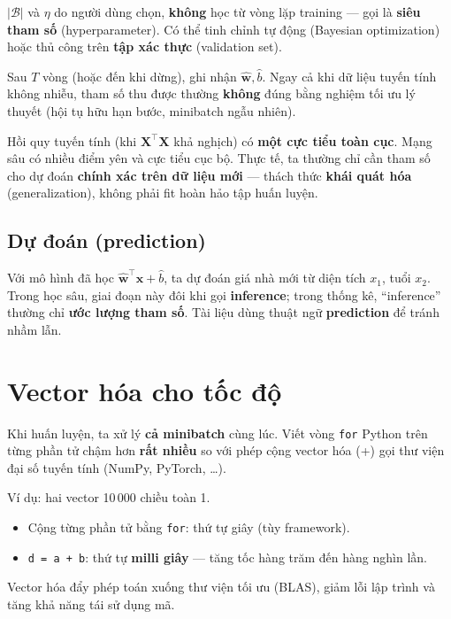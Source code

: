 \documentclass[12pt,a4paper]{article}
\begin{document}
\begin{dinhnghia}[title={Hyperparameter}]
$|\mathcal{B}|$ và $\eta$ do người dùng chọn, \textbf{không} học từ vòng lặp training --- gọi là \textbf{siêu tham số} (hyperparameter). Có thể tinh chỉnh tự động (Bayesian optimization) hoặc thủ công trên \textbf{tập xác thực} (validation set).

Sau $T$ vòng (hoặc đến khi dừng), ghi nhận $\hat{\mathbf{w}}, \hat{b}$. Ngay cả khi dữ liệu tuyến tính không nhiễu, tham số thu được thường \textbf{không} đúng bằng nghiệm tối ưu lý thuyết (hội tụ hữu hạn bước, minibatch ngẫu nhiên).
\end{dinhnghia}

\begin{ynghia}[title={Tối thiểu toàn cục và khái quát hóa}]
Hồi quy tuyến tính (khi $\mathbf{X}^\top\mathbf{X}$ khả nghịch) có \textbf{một cực tiểu toàn cục}. Mạng sâu có nhiều điểm yên và cực tiểu cục bộ. Thực tế, ta thường chỉ cần tham số cho dự đoán \textbf{chính xác trên dữ liệu mới} --- thách thức \textbf{khái quát hóa} (generalization), không phải fit hoàn hảo tập huấn luyện.
\end{ynghia}

\subsection{Dự đoán (prediction)}

Với mô hình đã học $\hat{\mathbf{w}}^\top \mathbf{x} + \hat{b}$, ta dự đoán giá nhà mới từ diện tích $x_1$, tuổi $x_2$. Trong học sâu, giai đoạn này đôi khi gọi \textbf{inference}; trong thống kê, ``inference'' thường chỉ \textbf{ước lượng tham số}. Tài liệu dùng thuật ngữ \textbf{prediction} để tránh nhầm lẫn.

\newpage

\section{Vector hóa cho tốc độ}

\begin{dongco}[title={Tại sao vector hóa?}]
Khi huấn luyện, ta xử lý \textbf{cả minibatch} cùng lúc. Viết vòng \texttt{for} Python trên từng phần tử chậm hơn \textbf{rất nhiều} so với phép cộng vector hóa (+) gọi thư viện đại số tuyến tính (NumPy, PyTorch, \ldots).

Ví dụ: hai vector 10\,000 chiều toàn 1.
\begin{itemize}
  \item Cộng từng phần tử bằng \texttt{for}: thứ tự giây (tùy framework).
  \item \texttt{d = a + b}: thứ tự \textbf{milli giây} --- tăng tốc hàng trăm đến hàng nghìn lần.
\end{itemize}
Vector hóa đẩy phép toán xuống thư viện tối ưu (BLAS), giảm lỗi lập trình và tăng khả năng tái sử dụng mã.
\end{dongco}
\end{document}
